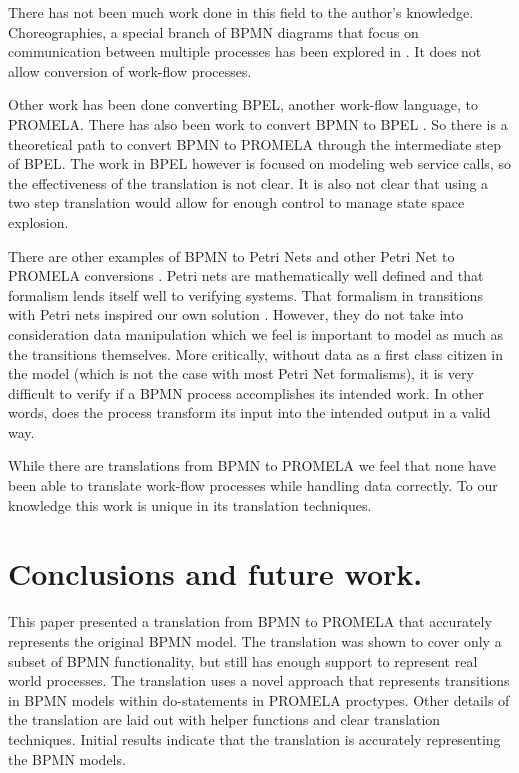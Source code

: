 \documentclass[11pt,twocolumn]{article}
\begin{document}
There has not been much work done in this field to the author's knowledge. Choreographies, a special branch of BPMN diagrams that focus on communication between multiple processes has been explored in \cite{choreography}. It does not allow conversion of work-flow processes. 

Other work has been done converting BPEL, another work-flow language, to PROMELA. There has also been work to convert BPMN to BPEL \cite{bpelToPromela}. So there is a theoretical path to convert BPMN to PROMELA through the intermediate step of BPEL. The work in BPEL however is focused on modeling web service calls, so the effectiveness of the translation is not clear. It is also not clear that using a two step translation would allow for enough control to manage state space explosion.  

There are other examples of BPMN to Petri Nets and other Petri Net to PROMELA conversions \cite{petrinetToPromela}. Petri nets are mathematically well defined and that formalism lends itself well to verifying systems. That formalism in transitions with Petri nets inspired our own solution \cite{petrinetInspiration}. However, they do not take into consideration data manipulation which we feel is important to model as much as the transitions themselves. More critically, without data as a first class citizen in the model (which is not the case with most Petri Net formalisms), it is very difficult to verify if a BPMN process accomplishes its intended work. In other words, does the process transform its input into the intended output in a valid way. 

While there are translations from BPMN to PROMELA we feel that none have been able to translate work-flow processes while handling data correctly. To our knowledge this work is unique in its translation techniques.

\section{Conclusions and future work.}

This paper presented a translation from BPMN to PROMELA that accurately represents the original BPMN model. The translation was shown to cover only a subset of BPMN functionality, but still has enough support to represent real world processes. The translation uses a novel approach that represents transitions in BPMN models within do-statements in PROMELA proctypes. Other details of the translation are laid out with helper functions and clear translation techniques. Initial results indicate that the translation is accurately representing the BPMN models.
\end{document}
